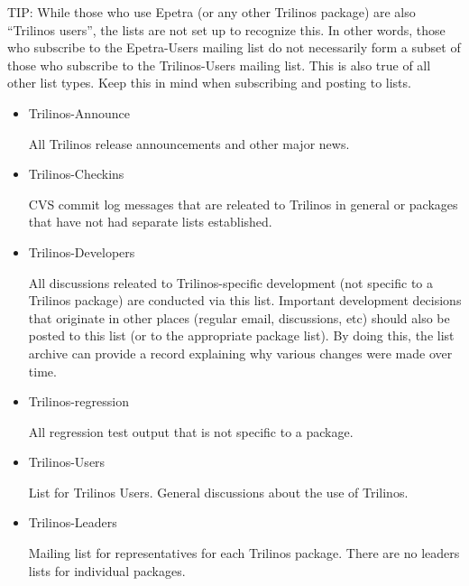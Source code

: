 \documentclass[12pt,strict]{TrilinosDevGuide}
\begin{document}
TIP: While those who use Epetra (or any other Trilinos package) are also
``Trilinos users'', the lists are not set up to recognize this.  In other 
words, those who subscribe to the Epetra-Users mailing list do not necessarily 
form a subset of those who subscribe to the Trilinos-Users mailing list.  This 
is also true of all other list types.  Keep this in mind when subscribing and 
posting to lists.
\begin{itemize}
\item Trilinos-Announce 

All Trilinos release announcements and other major news.

\item Trilinos-Checkins 

CVS commit log messages that are releated to Trilinos in general or packages 
that have not had separate lists established.

\item Trilinos-Developers 

All discussions releated to Trilinos-specific development (not specific to a 
Trilinos package) are conducted via this list.  Important development 
decisions that originate in other places (regular email, discussions, etc) 
should also be posted to this list (or to the appropriate package list).  
By doing this, the list archive can provide a record explaining why various 
changes were made over time.

\item Trilinos-regression 

All regression test output that is not specific to a package. 

\item Trilinos-Users 

List for Trilinos Users.  General discussions about the use of Trilinos.

\item Trilinos-Leaders

Mailing list for representatives for each Trilinos package.  There are no 
leaders lists for individual packages.
\end{itemize}

\end{document}

